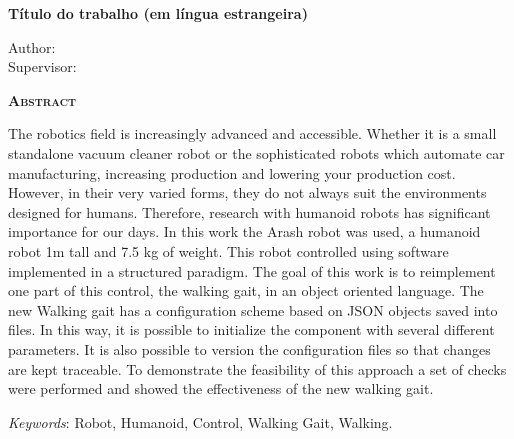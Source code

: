 \begin{center}
	{\Large{\textbf{Título do trabalho (em língua estrangeira)}}}
\end{center}

\vspace{1cm}

\begin{flushright}
	Author: \writeauthor\\
	Supervisor: \writeteacheren
\end{flushright}

\vspace{1cm}

\begin{center}
	\Large{\textsc{\textbf{Abstract}}}
\end{center}

The robotics field is increasingly advanced and accessible. Whether it is a small standalone vacuum cleaner robot or the sophisticated robots which automate car manufacturing, increasing production and lowering your production cost. However, in their very varied forms, they do not always suit the environments designed for humans. Therefore, research with humanoid robots has significant importance for our days. In this work the Arash robot was used, a humanoid robot 1m tall and 7.5 kg of weight. This robot controlled using software implemented in a structured paradigm. The goal of this work is to reimplement one part of this control, the walking gait, in an object oriented language. The new Walking gait has a configuration scheme based on JSON objects saved into files. In this way, it is possible to initialize the component with several different parameters. It is also possible to version the configuration files so that changes are kept traceable. To demonstrate the feasibility of this approach a set of checks were performed and showed the effectiveness of the new walking gait.

\textit{Keywords}: Robot, Humanoid, Control, Walking Gait, Walking.